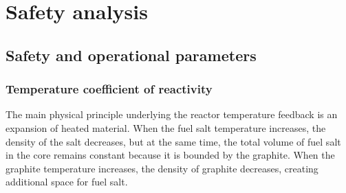 \chapter[Safety analysis]{Safety analysis}

\section{Safety and operational parameters}

\subsection{Temperature coefficient of reactivity}
The main physical principle underlying the reactor temperature feedback is an 
expansion of heated material. When the fuel salt temperature increases, the 
density of the salt decreases, but at the same time, the total volume of fuel 
salt in the core remains constant because it is bounded by the graphite. When 
the graphite temperature increases, the density of graphite decreases, 
creating additional space for fuel salt. 

